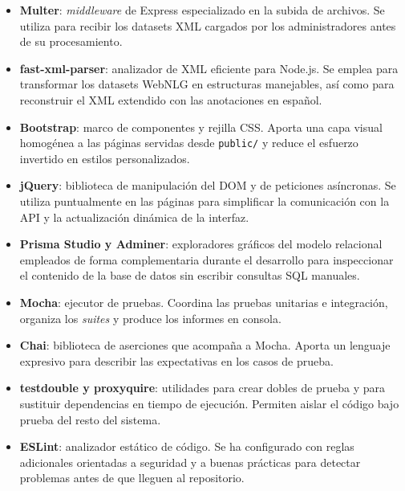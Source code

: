 \begin{itemize}
	      explorador SQL como servicios coordinados, garantizando que el entorno de
	      desarrollo sea reproducible entre máquinas.
	\item \textbf{Multer}: \textit{middleware} de Express especializado en la subida de
	      archivos. Se utiliza para recibir los datasets XML cargados por los
	      administradores antes de su procesamiento.
	\item \textbf{fast-xml-parser}: analizador de XML eficiente para Node.js. Se emplea
	      para transformar los datasets WebNLG en estructuras manejables, así como para
	      reconstruir el XML extendido con las anotaciones en español.
	\item \textbf{Bootstrap}: marco de componentes y rejilla CSS. Aporta una capa visual
	      homogénea a las páginas servidas desde \texttt{public/} y reduce el esfuerzo
	      invertido en estilos personalizados.
	\item \textbf{jQuery}: biblioteca de manipulación del DOM y de peticiones asíncronas.
	      Se utiliza puntualmente en las páginas para simplificar la comunicación con la
	      API y la actualización dinámica de la interfaz.
	\item \textbf{Prisma Studio y Adminer}: exploradores gráficos del modelo relacional
	      empleados de forma complementaria durante el desarrollo para inspeccionar el
	      contenido de la base de datos sin escribir consultas SQL manuales.
	\item \textbf{Mocha}: ejecutor de pruebas. Coordina las pruebas unitarias e
	      integración, organiza los \textit{suites} y produce los informes en consola.
	\item \textbf{Chai}: biblioteca de aserciones que acompaña a Mocha. Aporta un
	      lenguaje expresivo para describir las expectativas en los casos de prueba.
	\item \textbf{testdouble y proxyquire}: utilidades para crear dobles de prueba y para
	      sustituir dependencias en tiempo de ejecución. Permiten aislar el código bajo
	      prueba del resto del sistema.
	\item \textbf{ESLint}: analizador estático de código. Se ha configurado con reglas
	      adicionales orientadas a seguridad y a buenas prácticas para detectar problemas
	      antes de que lleguen al repositorio.
\end{itemize}
